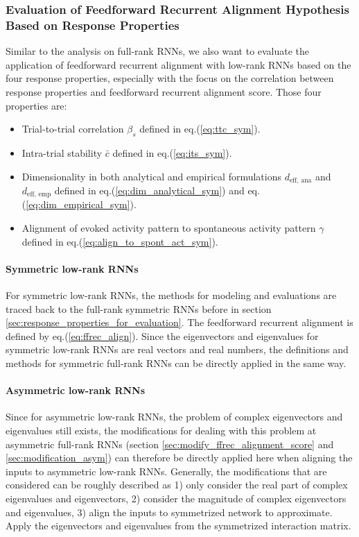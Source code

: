 \documentclass[11pt]{article}
\begin{document}
{	\subsubsection{Evaluation of Feedforward Recurrent Alignment Hypothesis Based on Response Properties}
	Similar to the analysis on full-rank RNNs, we also want to evaluate the application of feedforward recurrent alignment with low-rank RNNs based on the four response properties, especially with the focus on the correlation between response properties and feedforward recurrent alignment score. Those four properties are:
		\begin{itemize}
			\item Trial-to-trial correlation $\beta_s$ defined in eq.(\ref{eq:ttc_sym}).
			\item Intra-trial stability $\bar{c}$ defined in eq.(\ref{eq:its_sym}).
			\item Dimensionality in both analytical and empirical formulations $d_{\text{eff, ana}}$ and $d_{\text{eff, emp}}$ defined in eq.(\ref{eq:dim_analytical_sym}) and eq.(\ref{eq:dim_empirical_sym}). 
			\item Alignment of evoked activity pattern to spontaneous activity pattern $\gamma$ defined in eq.(\ref{eq:align_to_spont_act_sym}).
		\end{itemize}
	
	\paragraph{Symmetric low-rank RNNs} For symmetric low-rank RNNs, the methods for modeling and evaluations are traced back to the full-rank symmetric RNNs before in section \ref{sec:response_properties_for_evaluation}. The feedforward recurrent alignment is defined by eq.(\ref{eq:ffrec_align}). Since the eigenvectors and eigenvalues for symmetric low-rank RNNs are real vectors and real numbers, the definitions and methods for symmetric full-rank RNNs can be directly applied in the same way. 
	
	\paragraph{Asymmetric low-rank RNNs} Since for asymmetric low-rank RNNs, the problem of complex eigenvectors and eigenvalues still exists, the modifications for dealing with this problem at asymmetric full-rank RNNs (section \ref{sec:modify_ffrec_alignment_score} and \ref{sec:modification_asym}) can therefore be directly applied here when aligning the inputs to asymmetric low-rank RNNs. Generally, the modifications that are considered can be roughly described as 1) only consider the real part of complex eigenvalues and eigenvectors, 2) consider the magnitude of complex eigenvectors and eigenvalues, 3) align the inputs to symmetrized network to approximate. Apply the eigenvectors and eigenvalues from the symmetrized interaction matrix.
	
}
\end{document}
